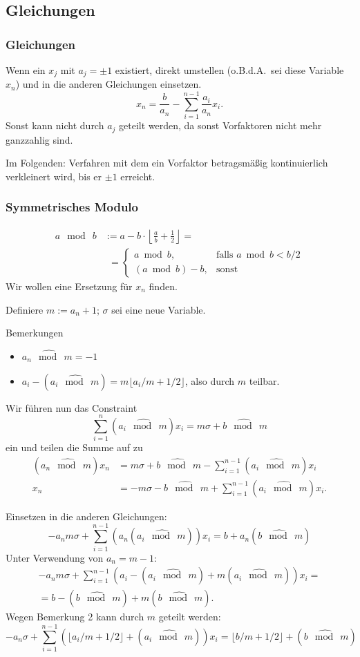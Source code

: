 \documentclass[hyperref={pdfpagelabels=false}]{beamer}
\newcommand{\hmod}{\ \widehat\bmod\ }
\begin{document}
\subsection{Gleichungen}
\begin{frame}
	\frametitle{Gleichungen}
	Wenn ein $x_j$ mit $a_j = \pm 1$ existiert, direkt umstellen (o.B.d.A.\ sei diese Variable $x_n$) und in die anderen Gleichungen einsetzen.
	\[ x_n = \frac{b}{a_n} - \sum_{i=1}^{n-1} \frac{a_i}{a_n} x_i. \]
	Sonst kann nicht durch $a_j$ geteilt werden, da sonst Vorfaktoren nicht mehr ganzzahlig sind.

	Im Folgenden: Verfahren mit dem ein Vorfaktor betragsmäßig kontinuierlich verkleinert wird, bis er $\pm 1$ erreicht.
\end{frame}
\begin{frame}
	\frametitle{Symmetrisches Modulo}
	\begin{align*}
		a \hmod b &:= a - b \cdot \left\lfloor \frac{a}{b} + \frac{1}{2} \right\rfloor =\\
		&\phantom{:}= \begin{cases} {a \bmod b,} & \text{falls } {a \bmod b < b/2} \\ {(a \bmod b) - b,} & \text{sonst} \end{cases}
	\end{align*}
	Wir wollen eine Ersetzung für $x_n$ finden.

	Definiere $m := a_n + 1$; $\sigma$ sei eine neue Variable.
\end{frame}
\begin{frame}
	\begin{block}{Bemerkungen}
		\begin{itemize}
			\item $a_n \hmod m = -1$
			\item $a_i - (a_i \hmod m) = m \lfloor a_i/m + 1/2 \rfloor$, also durch $m$ teilbar.
		\end{itemize}
	\end{block}
	Wir führen nun das Constraint
	\[ \sum_{i=1}^n (a_i \hmod m) x_i = m \sigma + b \hmod m \]
	ein und teilen die Summe auf zu
	\begin{align*}
		(a_n \hmod m) x_n &= m \sigma + b \hmod m - \sum_{i=1}^{n-1} (a_i \hmod m) x_i \\
		x_n &= -m \sigma - b \hmod m + \sum_{i=1}^{n-1} (a_i \hmod m) x_i.
	\end{align*}
\end{frame}
\begin{frame}
	Einsetzen in die anderen Gleichungen:
	\[ -a_n m \sigma + \sum_{i=1}^{n-1} ( a_n ( a_i \hmod m ) ) x_i = b + a_n ( b \hmod m ) \]
	Unter Verwendung von $a_n = m - 1$:
	\begin{multline*}
		-a_n m \sigma + \sum_{i=1}^{n-1} ( a_i - ( a_i \hmod m ) + m ( a_i \hmod m ) )  x_i =\\
		= b - ( b \hmod m ) + m ( b \hmod m ).
	\end{multline*}
	Wegen Bemerkung 2 kann durch $m$ geteilt werden:
	\[ -a_n \sigma + \sum_{i=1}^{n-1} ( \lfloor a_i/m + 1/2 \rfloor +  ( a_i \hmod m ) ) x_i = \lfloor b/m + 1/2 \rfloor + ( b \hmod m ) \]
\end{frame}
\end{document}
